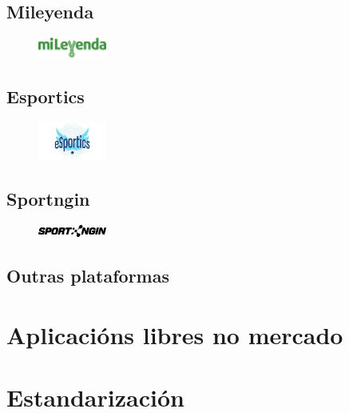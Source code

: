     \subsection{Mileyenda}

      \begin{figure}[h!]
	    \begin{center}
	      \includegraphics[width=0.2\textwidth]{img/logos/mileyenda.png}
	    \end{center}
      \end{figure}

    \subsection{Esportics}

    \begin{figure}[h!]
	  \begin{center}
	    \includegraphics[width=0.2\textwidth]{img/logos/esportics.jpg}
	  \end{center}
    \end{figure}

    \subsection{Sportngin}

    \begin{figure}[h!]
	  \begin{center}
	    \includegraphics[width=0.2\textwidth]{img/logos/sportngin.png}
	  \end{center}
    \end{figure}

    \subsection{Outras plataformas}
  \section{Aplicacións libres no mercado}
  \section{Estandarización}
